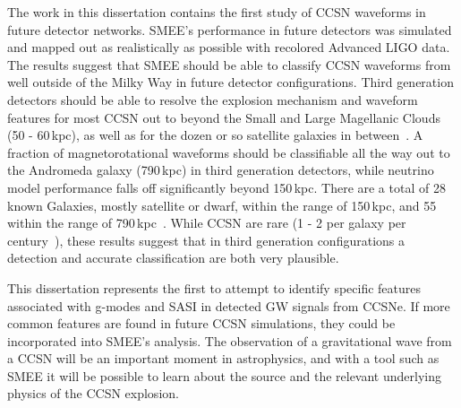 The work in this dissertation contains the first study of CCSN waveforms in future detector networks. SMEE's performance in future detectors was simulated and mapped out as realistically as possible with recolored Advanced LIGO data. The results suggest that SMEE should be able to classify CCSN waveforms from well outside of the Milky Way in future detector configurations. Third generation detectors should be able to resolve the explosion mechanism and waveform features for most CCSN out to beyond the Small and Large Magellanic Clouds (50 - 60\,kpc), as well as for the dozen or so satellite galaxies in between~\cite{karachentsev2004catalog, belokurov2007cats}. A fraction of magnetorotational waveforms should be classifiable all the way out to the Andromeda galaxy (790\,kpc) in third generation detectors, while neutrino model performance falls off significantly beyond 150\,kpc. There are a total of 28 known Galaxies, mostly satellite or dwarf, within the range of 150\,kpc, and 55 within the range of 790\,kpc~\cite{karachentsev2004catalog, belokurov2007cats}. While CCSN are rare (1 - 2 per galaxy per century~\cite{1991ARA&A..29..363V, 1993A&A...273..383C, Alexeyev2002}), these results suggest that in third generation configurations a detection and accurate classification are both very plausible.

This dissertation represents the first to attempt to identify specific features associated with g-modes and SASI in detected GW signals from CCSNe. If more common features are found in future CCSN simulations, they could be incorporated into SMEE's analysis. The observation of a gravitational wave from a CCSN will be an important moment in astrophysics, and with a tool such as SMEE it will be possible to learn about the source and the relevant underlying physics of the CCSN explosion.

